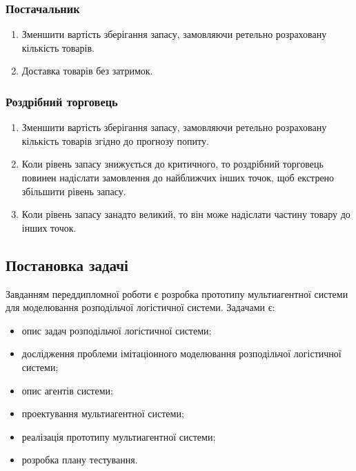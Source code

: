 \subsubsection{Постачальник}
\begin{enumerate}
	\item Зменшити вартість зберігання запасу, замовляючи ретельно розраховану кількість товарів.
	\item Доставка товарів без затримок.
\end{enumerate}

\subsubsection{Роздрібний торговець}
\begin{enumerate}
	\item Зменшити вартість зберігання запасу, замовляючи ретельно розраховану кількість товарів згідно до прогнозу попиту.
	\item Коли рівень запасу знижується до критичного, то роздрібний торговець повинен надіслати замовлення до найближчих інших точок, щоб екстрено збільшити рівень запасу.
	\item Коли рівень запасу занадто великий, то він може надіслати частину товару до інших точок.
\end{enumerate}

\subsection{Постановка задачі}
Завданням переддипломної роботи є розробка прототипу  мультиагентної системи для моделювання розподільчої логістичної системи.
Задачами є:
\begin{itemize}
	\item опис задач розподільчої логістичної системи;
	\item дослідження проблеми імітаціонного моделювання розподільчої логістичної системи;
	\item опис агентів системи;
	\item проектування мультиагентної системи;
	\item реалізація прототипу мультиагентної системи;
	\item розробка плану тестування.
\end{itemize}
